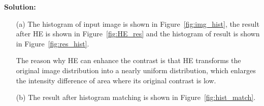 \documentclass[11pt,letterpaper]{article}
\begin{document}
\textbf{Solution:}
\begin{itemize}
	\item [(a)] The histogram of input image is shown in Figure~\ref{fig:img_hist}, the result after HE is shown in Figure~\ref{fig:HE_res} and the histogram of result is shown in Figure~\ref{fig:res_hist}. 
		\par The reason why HE can enhance the contrast is that HE transforms the original image distribution into a nearly uniform distribution, which enlarges the intensity difference of area where its original contrast is low.
	\begin{figure}
		\centering
		\caption{}
	\end{figure}
	\item [(b)] The result after histogram matching is shown in Figure~\ref{fig:hist_match}.


\end{itemize}
\end{document}
